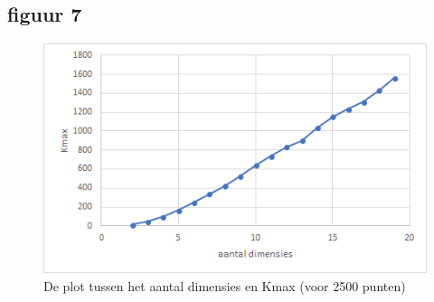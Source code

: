 \documentclass[12pt]{article}
\begin{document}
\subsection{figuur 7}





\begin{figure}
\includegraphics[width=\textwidth]{dim-Kmax.png}
\caption{De plot tussen het aantal dimensies en Kmax (voor 2500 punten)}
\end{figure}
\end{document}
